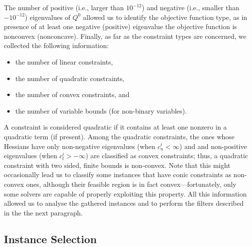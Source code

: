 The number of positive (i.e., larger than $10^{-12}$) and negative (i.e., smaller than $-10^{-12}$) eigenvalues of $Q^0$ allowed us to identify the
objective function type, as in presence of at least one negative (positive) eigenvalue
the objective function is nonconvex (nonconcave). Finally, as far as the constraint types
are concerned, we collected the following information:
%
\begin{itemize}
 \item the number of linear constraints, %
 \item the number of quadratic constraints, %
 \item the number of convex constraints, and %
 \item the number of variable bounds (for non-binary variables). %
\end{itemize}
%
A constraint is considered quadratic if it contains at least one nonzero in
a quadratic term (if present). Among the quadratic constraints, the ones whose
Hessians have only non-negative eigenvalues (when $c_u^i < \infty$) and
and non-positive eigenvalues (when $c_l^i > - \infty$)
are classified as convex constraints; thus, a quadratic constraint with
two sided, finite bounds is non-convex.
Note that this might occasionally lead us to classify some instances that have conic constraints as non-convex ones, although their feasible region is in fact convex---fortunately, only some solvers are capable of properly exploiting this property.
 All this information allowed us to analyse the gathered instances and to perform the
filters described in the the next paragraph.

\subsection{Instance Selection}\label{subsec:selection}

